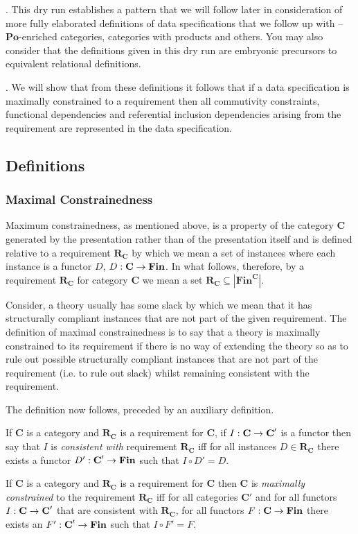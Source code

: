 \documentclass[10pt,a4paper]{article}
\theoremstyle{remark}
\newcommand{\catc}[1][C]{\textbf{#1}}
\newcommand{\catcp}[1][C]{\textbf{#1}'}
\newcommand{\reqt}{\textbf{R}}
\newcommand{\reqtc}[1][\catc]{\reqt_{#1}}
\newcommand{\Fin}{\ensuremath{\textbf{Fin}} }
\newcommand{\Po}{\ensuremath{\textbf{Po}} }
\newlength{\oldparindent}
\newcommand{\ind}{\hspace*{\oldparindent}}
\newcounter{para}
\newcommand\note{\par\ind\refstepcounter{para}\thepara.\space}
\newcommand{\term}[1]{\textit{#1}}  %
\begin{document}
\note 
This dry run establishes a pattern that we will follow later in consideration of more fully elaborated 
definitions of 
data specifications that we follow up with -- $\Po$-enriched categories, categories with products and others. 
You may also consider that the definitions given in this dry run are embryonic precursors to equivalent relational definitions.

\note
We will show that from these definitions it follows that if a data specification is maximally constrained to a
requirement then  all commutivity constraints,  functional dependencies and referential inclusion dependencies arising from the requirement are represented in the data specification.

\subsection {Definitions}
\subsubsection{Maximal Constrainedness}
Maximum constrainedness, as mentioned above, is a property of the category $\catc$ generated by the presentation  rather than of the presentation itself and is defined  relative to a requirement $\reqtc$ by which we mean a set of 
instances where each instance is a functor $D$, $D: \catc \morph \Fin$. In what follows, therefore,  by a requirement $\reqtc$ for category $\catc$ we mean a set  $\reqtc \subseteq | \Fin^{\catc} |$. 

Consider, a theory usually has some slack by which we mean that it has structurally compliant instances that are not part of the given requirement.  The definition of maximal constrainedness is to say that a theory is maximally constrained to its requirement if there is no way of extending the theory so as to rule out possible structurally compliant instances that are not part of the requirement (i.e. to rule out slack) whilst remaining consistent with the requirement.

The definition now follows, preceded by an auxiliary definition.
\begin{definition}
If $\catc$ is a category and $\reqtc$ is a requirement for $\catc$,  if $I: \catc \morph \catcp$ is a functor then say that $I$ is \term{consistent with} requirement $\reqtc$ iff for all instances $D \in \reqtc$ there exists a functor $D':\catcp \morph \Fin$ such that $I \circ D'=D$.
\end{definition}
\begin{definition}
If $\catc$ is a category and $\reqtc$ is a requirement for $\catc$ then $\catc$ is \term{maximally constrained} to the requirement $\reqtc$ iff for all categories $\catcp$ and for all functors $I:\catc \morph \catcp$ that are consistent with $\reqtc$, for all functors $F: \catc \morph \Fin$  there exists an $F' : \catcp \morph \Fin$ such that $I \circ F'=F$.
\end{definition}
\end{document}
